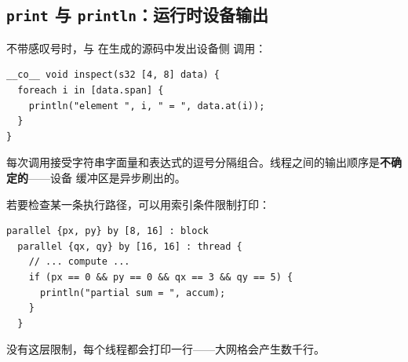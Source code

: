 \subsection*{\texttt{print} 与 \texttt{println}：运行时设备输出}

不带感叹号时，\co@print@ 与 \co@println@ 在生成的源码中发出设备侧 \co@printf@ 调用：

\begin{lstlisting}[language=croqtile,caption={一个运行时检视核函数}]
__co__ void inspect(s32 [4, 8] data) {
  foreach i in [data.span] {
    println("element ", i, " = ", data.at(i));
  }
}
\end{lstlisting}

每次调用接受字符串字面量和表达式的逗号分隔组合。线程之间的输出顺序是\textbf{不确定的}——设备 \co@printf@ 缓冲区是异步刷出的。

若要检查某一条执行路径，可以用索引条件限制打印：

\begin{lstlisting}[language=croqtile,caption={并行块内的打印}]
parallel {px, py} by [8, 16] : block
  parallel {qx, qy} by [16, 16] : thread {
    // ... compute ...
    if (px == 0 && py == 0 && qx == 3 && qy == 5) {
      println("partial sum = ", accum);
    }
  }
\end{lstlisting}

没有这层限制，每个线程都会打印一行——大网格会产生数千行。
